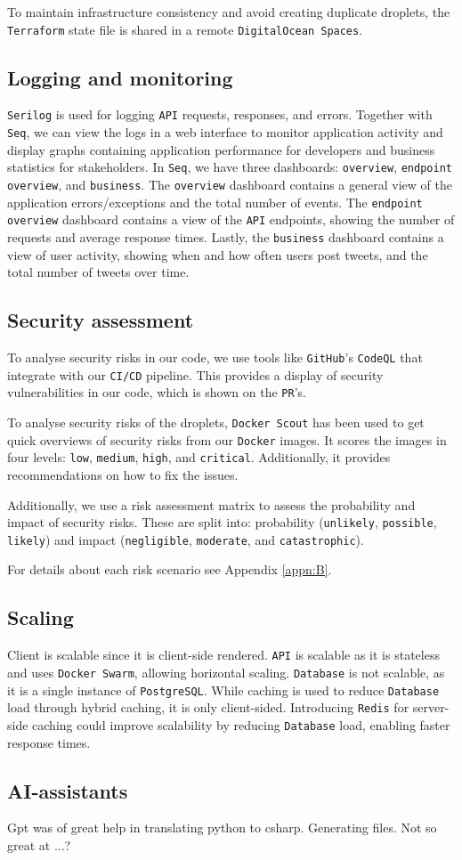 To maintain infrastructure consistency and avoid creating duplicate droplets,
the \texttt{Terraform} state file is shared in a remote \texttt{DigitalOcean Spaces}.

\subsection{Logging and monitoring}
\texttt{Serilog} is used for logging \texttt{API} requests, responses, and errors.
Together with \texttt{Seq}, we can view the logs in a web interface to monitor 
application activity and display graphs containing application performance 
for developers and business statistics for stakeholders.
In \texttt{Seq}, we have three dashboards: \texttt{overview}, \texttt{endpoint overview}, and \texttt{business}.
The \texttt{overview} dashboard contains a general view of the application 
errors/exceptions and the total number of events.
The \texttt{endpoint overview} dashboard contains a view of the \texttt{API} endpoints,
showing the number of requests and average response times.
Lastly, the \texttt{business} dashboard contains a view of user activity,
showing when and how often users post tweets, and the total number of tweets over time.


\subsection{Security assessment}
To analyse security risks in our code, we use tools like \texttt{GitHub}'s \texttt{CodeQL}\cite{codeql} that 
integrate with our \texttt{CI/CD} pipeline.
This provides a display of security vulnerabilities in our code,
which is shown on the \texttt{PR}'s.

To analyse security risks of the droplets, \texttt{Docker Scout} has been used to get
quick overviews of security risks from our \texttt{Docker} images.
It scores the images in four levels: \texttt{low}, \texttt{medium}, \texttt{high}, and \texttt{critical}.
Additionally, it provides recommendations on how to fix the issues.

Additionally, we use a risk assessment matrix to assess the probability and impact of security risks. 
These are split into: probability (\texttt{unlikely}, \texttt{possible}, \texttt{likely}) and impact (\texttt{negligible}, \texttt{moderate}, and \texttt{catastrophic}).

For details about each risk scenario see Appendix \ref{appn:B}.

\subsection{Scaling}
Client is scalable since it is client-side rendered.
\texttt{API} is scalable as it is stateless and uses \texttt{Docker Swarm}, allowing horizontal scaling.
\texttt{Database} is not scalable, as it is a single instance of \texttt{PostgreSQL}.
While caching is used to reduce \texttt{Database} load through hybrid caching, it is only client-sided.
Introducing \texttt{Redis} for server-side caching could improve scalability by reducing \texttt{Database} load, enabling faster response times.

\subsection{AI-assistants}

Gpt was of great help in translating python to csharp.
Generating files.
Not so great at ...?